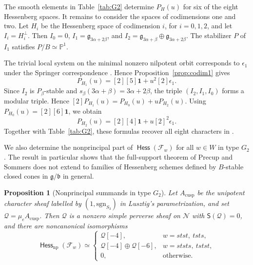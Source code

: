 \documentclass[11pt]{amsart}
\numberwithin{equation}{section}
\newtheorem{proposition}[theorem]{Proposition}
\theoremstyle{definition}
\def\beq{\begin{equation}}
\def\eeq{\end{equation}}
\DeclareMathOperator{\Hess}{\mathsf{Hess}}
\def\PP{\mathbb{P}}
\def\fg{\mathfrak {g}}
\def\fb{\mathfrak {b}}
\begin{document}
The smooth elements in Table~\ref{tab:G2} determine $P_H(u)$ for six of the eight Hessenberg spaces.
It remains to consider the spaces of codimensions one and two.
Let $H_i$ be the Hessenberg space of codimension $i$, for $i=0,1,2$, and let $I_i=H_i^\perp$. 
Then $I_0=0$, $I_1=\fg_{3\alpha+2\beta}$, and $I_2=\fg_{3\alpha+\beta}\oplus\mathfrak g_{3\alpha+2\beta}$.
The stabilizer $P$ of $I_1$ satisfies $P/B\simeq\PP^1$.

The trivial local system on the minimal nonzero nilpotent orbit corresponds to $\epsilon_1$ under the Springer correspondence \cite{Carter}.
Hence Proposition~\ref{prop:codim1} gives
\beq\label{eq:G2.codim1}
P_{H_1}(u)=[2][5]\mathbf1+u^2[2]\epsilon_1.
\eeq
Since $I_2$ is $P_\beta$-stable and $s_\beta(3\alpha+\beta)=3\alpha+2\beta$, the triple $(I_2,I_1,I_0)$ forms a modular triple. 
Hence
$[2]P_{H_1}(u)=P_{H_0}(u)+uP_{H_2}(u)$.
Using $P_{H_0}(u)=[2][6]\mathbf1$, we obtain
\[
P_{H_2}(u)=[2][4]\mathbf1+u[2]^2\epsilon_1.
\]
Together with Table~\ref{tab:G2}, these formulas recover all eight characters in \cite[Table~5]{xue}.



\medskip


We also determine the nonprincipal part of $\Hess(\mathcal F_w)$ for all $w\in W$  in type $G_2$.
The result in particular shows that the full-support theorem of Precup and Sommers does not extend to families of Hessenberg schemes defined by $B$-stable closed cones in $\fg/\fb$ in general.


\begin{proposition}[Nonprincipal summands in type $G_2$]
\label{prop:G2.nonprincipal}
Let $A_{\mathrm{cusp}}$ be the unipotent character sheaf labelled by $(1,\mathrm{sgn}_{S_3})$ in Lusztig's parametrization, and set $\mathcal Q=\mu_e A_{\mathrm{cusp}}$.
Then $\mathcal Q$ is a nonzero simple perverse sheaf on $\mathcal N$ with $\mathsf S(\mathcal Q)=0$, and there are noncanonical isomorphisms
\[
\Hess_{\mathrm{np}}(\mathcal F_w)\simeq
\begin{cases}
\mathcal Q[-4],
    & w=stst,\ tsts,\\
\mathcal Q[-4]\oplus\mathcal Q[-6],
    & w=ststs,\ tstst,\\
0,  & \text{otherwise}.
\end{cases}
\]
\end{proposition}
\end{document}
